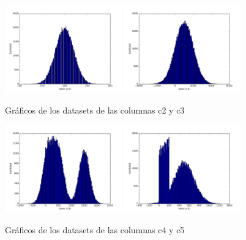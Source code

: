  
\begin{figure}[h!]
  \centering
  \includegraphics[width=0.45\textwidth]{./../source/datasets/img/c2}
  \includegraphics[width=0.45\textwidth]{./../source/datasets/img/c3}
  \caption{Gráficos de los datasets de las columnas c2 y c3}
 \end{figure}
 
\begin{figure}[h!]
  \centering
  \includegraphics[width=0.45\textwidth]{./../source/datasets/img/c4}
  \includegraphics[width=0.45\textwidth]{./../source/datasets/img/c5}
  \caption{Gráficos de los datasets de las columnas c4 y c5}
 \end{figure}
 
